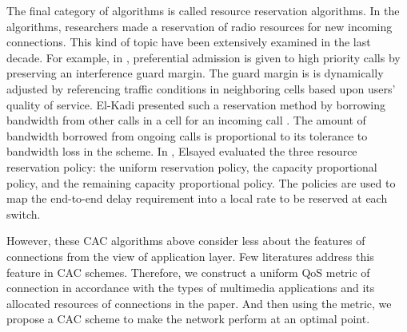 The final category of algorithms is called resource reservation algorithms.
In the algorithms, researchers made a reservation of radio resources for new incoming connections. 
This kind of topic have been extensively examined in the last decade. 
For example, in \cite{Chen_Kumar_Kuo_2003,Chen_Kuo_2004}, preferential admission is given to high priority calls by preserving an interference guard margin. 
The guard margin is is dynamically adjusted by referencing traffic conditions in neighboring cells based upon users' quality of service. 
El-Kadi presented such a reservation method by borrowing bandwidth from other calls in a cell for an incoming call \cite{EL-Kadi2002}. The amount of bandwidth borrowed from ongoing calls is proportional to its tolerance to bandwidth loss in the scheme. In \cite{Elsayed02performanceevaluation}, Elsayed evaluated the three resource reservation policy: the uniform reservation policy, the capacity proportional policy, and the remaining capacity proportional policy. The policies are used to map the end-to-end delay requirement into a local rate to be reserved at each switch. 

%
However, these CAC algorithms above consider less about the features of connections from the view of application layer. Few literatures address this feature in CAC schemes. 
Therefore, we construct a uniform QoS metric of connection in accordance with the types of multimedia applications and its allocated resources of connections in the paper. 
And then using the metric, we propose a CAC scheme to make the network perform at an optimal point. 

